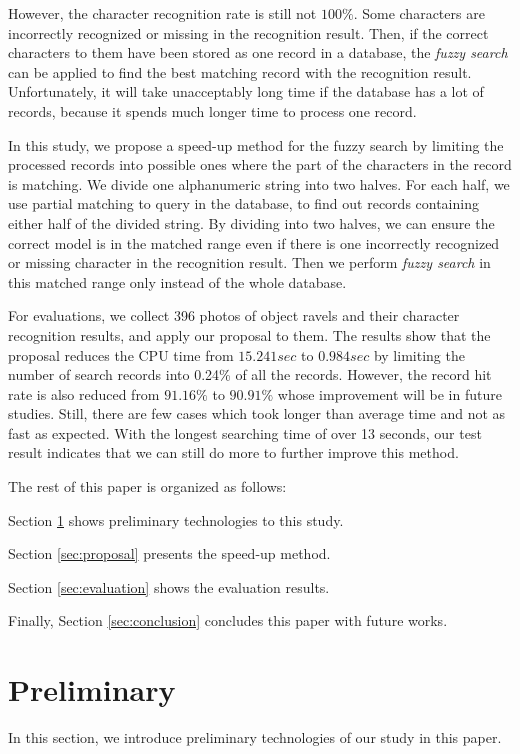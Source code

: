 \documentclass[technicalreport]{ieicej}
\begin{document}
    However, the character recognition rate is still not $100\%$. Some characters are incorrectly recognized or missing in the recognition result. Then, if the correct characters to them have been stored as one record in a database, the {\em fuzzy search} can be applied to find the best matching record with the recognition result. Unfortunately, it will take unacceptably long time if the database has a lot of records, because it spends much longer time to process one record. 

    In this study, we propose a speed-up method for the fuzzy search by limiting the processed records into possible ones where the part of the characters in the record is matching. 
    We divide one alphanumeric string into two halves. For each half, we use partial matching to query in the database, to find out records containing either half of the divided string. By dividing into two halves, we can ensure the correct model is in the matched range even if there is one incorrectly recognized or missing character in the recognition result. Then we perform {\em fuzzy search} in this matched range only instead of the whole database. 

    For evaluations, we collect 396 photos of object ravels and their character recognition results, and apply our proposal to them. The results show that the proposal reduces the CPU time from $15.241sec$ to $0.984sec$ by limiting the number of search records into 0.24\% of all the records. However, the record hit rate is also reduced from $91.16\%$ to $90.91\%$ whose improvement will be in future studies.
    Still, there are few cases which took longer than average time and not as fast as expected. With the longest searching time of over 13 seconds, our test result indicates that we can still do more to further improve this method.

    The rest of this paper is organized as follows:

    Section \ref{sec:preliminary} shows preliminary technologies to this study.

    Section \ref{sec:proposal} presents the speed-up method.

    Section \ref{sec:evaluation} shows the evaluation results.

    Finally, Section \ref{sec:conclusion} concludes this paper with future works.


\section{Preliminary}
\label{sec:preliminary}
    In this section, we introduce preliminary technologies of our study in this paper.
\end{document}
